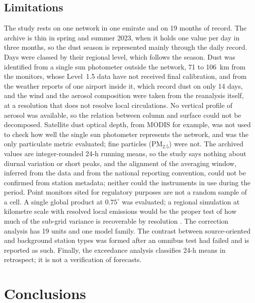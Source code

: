 \subsection{Limitations}
\label{sec:limits}

The study rests on one network in one emirate and on 19 months of record. The archive is thin in
spring and summer 2023, when it holds one value per day in three months, so the dust season is
represented mainly through the daily record. Days were classed by their regional \pmten{} level,
which follows the season. Dust was identified from a single sun photometer outside the network,
71 to 106~km from the monitors, whose Level~1.5 data have not received final calibration, and from
the weather reports of one airport inside it, which record dust on only 14 days, and the
wind and the aerosol composition were taken from the reanalysis itself, at a resolution that does
not resolve local circulations. No vertical profile of aerosol was available, so the relation between column
and surface could not be decomposed. Satellite dust optical depth, from MODIS for example, was not used to
check how well the single sun photometer represents the network, and \pmten{} was the only
particulate metric evaluated; fine particles (PM$_{2.5}$) were not. The archived values are integer-rounded 24-h running
means, so the study says nothing about diurnal variation or short peaks, and the alignment of the
averaging window, inferred from the data and from the national reporting convention, could not be
confirmed from station metadata; neither could the instruments in use during the period. Point monitors sited for regulatory purposes are not a random
sample of a cell. A single global product at $0.75^{\circ}$ was evaluated; a regional simulation at
kilometre scale with resolved local emissions would be the proper test of how much of the
sub-grid variance is recoverable by resolution \citep{ukhov2020}. The correction analysis has 19
units and one model family. The contrast between source-oriented and background station types was
formed after an omnibus test had failed and is reported as such. Finally, the exceedance analysis
classifies 24-h means in retrospect; it is not a verification of forecasts.

\section{Conclusions}

